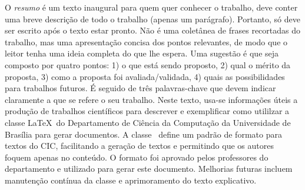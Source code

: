 O \emph{resumo} é um texto inaugural para quem quer conhecer o trabalho, deve conter 
uma breve descrição de todo o trabalho (apenas um parágrafo). Portanto, só deve 
ser escrito após o texto estar pronto. Não é uma coletânea de frases recortadas 
do trabalho, mas uma apresentação concisa dos pontos relevantes, de modo que o
leitor tenha uma ideia completa do que lhe espera. Uma sugestão é que seja composto
por quatro pontos: 1) o que está sendo proposto, 2) qual o mérito da proposta, 3)
como a proposta foi avaliada/validada, 4) quais as possibilidades para trabalhos
futuros. É seguido de três palavras-chave que devem indicar claramente a que se 
refere o seu trabalho. Neste texto, usa-se informações úteis a produção de trabalhos 
científicos para descrever e exemplificar como utililzar a classe \LaTeX\ do 
Departamento de Ciência da Computação da Universidade de Brasília para gerar 
documentos. A classe \unbcic\ define um padrão de formato para textos do CIC, facilitando a
geração de textos e permitindo que os autores foquem apenas no conteúdo. O formato
foi aprovado pelos professores do departamento e utilizado para gerar este documento.
Melhorias futuras incluem manutenção contínua da classe e aprimoramento do texto
explicativo.